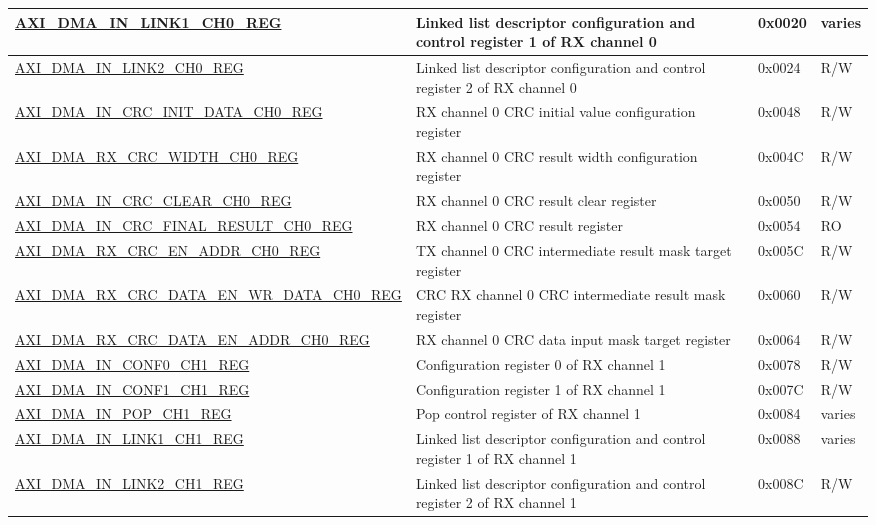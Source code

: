 \begin{longtable}{ | l | p{10cm} | p{1.3cm} | l | }
\hyperref[regdesc:AXIDMAINLINK1CHNREG]{AXI\_DMA\_IN\_LINK1\_CH0\_REG} & Linked list descriptor configuration and control register 1 of RX channel 0 & 0x0020 & varies \\ \hline
\hyperref[regdesc:AXIDMAINLINK2CHNREG]{AXI\_DMA\_IN\_LINK2\_CH0\_REG} & Linked list descriptor configuration and control register 2 of RX channel 0 & 0x0024 & R/W \\ \hline
\hyperref[regdesc:AXIDMAINCRCINITDATACHNREG]{AXI\_DMA\_IN\_CRC\_INIT\_DATA\_CH0\_REG} & RX channel 0 CRC initial value configuration register & 0x0048 & R/W \\ \hline
\hyperref[regdesc:AXIDMARXCRCWIDTHCHNREG]{AXI\_DMA\_RX\_CRC\_WIDTH\_CH0\_REG} & RX channel 0 CRC result width configuration register & 0x004C & R/W \\ \hline
\hyperref[regdesc:AXIDMAINCRCCLEARCHNREG]{AXI\_DMA\_IN\_CRC\_CLEAR\_CH0\_REG} & RX channel 0 CRC result clear register & 0x0050 & R/W \\ \hline
\hyperref[regdesc:AXIDMAINCRCFINALRESULTCHNREG]{AXI\_DMA\_IN\_CRC\_FINAL\_RESULT\_CH0\_REG} & RX channel 0 CRC result register & 0x0054 & RO \\ \hline
\hyperref[regdesc:AXIDMARXCRCENADDRCHNREG]{AXI\_DMA\_RX\_CRC\_EN\_ADDR\_CH0\_REG} & TX channel 0 CRC intermediate result mask target register & 0x005C & R/W \\ \hline
\hyperref[regdesc:AXIDMARXCRCDATAENWRDATACHNREG]{AXI\_DMA\_RX\_CRC\_DATA\_EN\_WR\_DATA\_CH0\_REG} & CRC RX channel 0 CRC intermediate result mask register & 0x0060 & R/W \\ \hline
\hyperref[regdesc:AXIDMARXCRCDATAENADDRCHNREG]{AXI\_DMA\_RX\_CRC\_DATA\_EN\_ADDR\_CH0\_REG} & RX channel 0 CRC data input mask target register & 0x0064 & R/W \\ \hline
\hyperref[regdesc:AXIDMAINCONF0CHNREG]{AXI\_DMA\_IN\_CONF0\_CH1\_REG} & Configuration register 0 of RX channel 1 & 0x0078 & R/W \\ \hline
\hyperref[regdesc:AXIDMAINCONF1CHNREG]{AXI\_DMA\_IN\_CONF1\_CH1\_REG} & Configuration register 1 of RX channel 1 & 0x007C & R/W \\ \hline
\hyperref[regdesc:AXIDMAINPOPCHNREG]{AXI\_DMA\_IN\_POP\_CH1\_REG} & Pop control register of RX channel 1 & 0x0084 & varies \\ \hline
\hyperref[regdesc:AXIDMAINLINK1CHNREG]{AXI\_DMA\_IN\_LINK1\_CH1\_REG} & Linked list descriptor configuration and control register 1 of RX channel 1 & 0x0088 & varies \\ \hline
\hyperref[regdesc:AXIDMAINLINK2CHNREG]{AXI\_DMA\_IN\_LINK2\_CH1\_REG} & Linked list descriptor configuration and control register 2 of RX channel 1 & 0x008C & R/W \\ \hline

\end{longtable}
